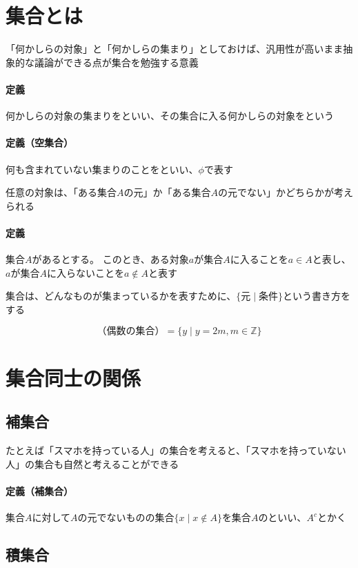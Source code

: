 \documentclass[../book_need-set-theory]{subfiles}
\begin{document}
\section{集合とは}

「何かしらの対象」と「何かしらの集まり」としておけば、汎用性が高いまま抽象的な議論ができる点が集合を勉強する意義

\begin{oframed}
  \paragraph{定義}
  何かしらの対象の集まりをといい、その集合に入る何かしらの対象をという
\end{oframed}

\begin{oframed}
  \paragraph{定義（空集合）}
  何も含まれていない集まりのことをといい、$\phi $で表す
\end{oframed}

任意の対象は、「ある集合$A$の元」か「ある集合$A$の元でない」かどちらかが考えられる

\begin{oframed}
  \paragraph{定義}
  集合$A$があるとする。
  このとき、ある対象$a$が集合$A$に入ることを$a \in A$と表し、$a$が集合$A$に入らないことを$a \notin A$と表す
\end{oframed}

集合は、どんなものが集まっているかを表すために、$\{\text{元}\mid\text{条件}\}$という書き方をする

\begin{equation*}
  \text{（偶数の集合）} = \{y \mid y = 2m, m \in \mathbb{Z} \}
\end{equation*}

\section{集合同士の関係}

\subsection{補集合}

たとえば「スマホを持っている人」の集合を考えると、「スマホを持っていない人」の集合も自然と考えることができる

\begin{oframed}
  \paragraph{定義（補集合）}
  集合$A$に対して$A$の元でないものの集合$\{x \mid x \notin A\}$を集合$A$のといい、$A^c$とかく
\end{oframed}

\subsection{積集合}
\end{document}
